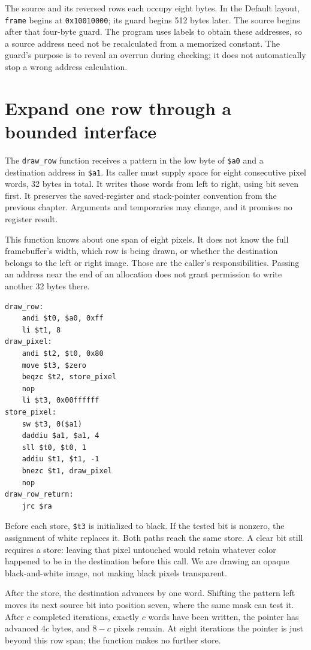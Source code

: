 The source and its reversed rows each occupy eight bytes. In the Default layout,
\texttt{frame} begins at \texttt{0x10010000}; its guard begins 512 bytes later.
The source begins after that four-byte guard. The program uses labels to obtain
these addresses, so a source address need not be recalculated from a memorized
constant. The guard's purpose is to reveal an overrun during checking; it does
not automatically stop a wrong address calculation.

\section{Expand one row through a bounded interface}

The \texttt{draw\_row} function receives a pattern in the low byte of
\texttt{\$a0} and a destination address in \texttt{\$a1}. Its caller must supply
space for eight consecutive pixel words, 32 bytes in total. It writes those words
from left to right, using bit seven first. It preserves the saved-register and
stack-pointer convention from the previous chapter. Arguments and temporaries
may change, and it promises no register result.

This function knows about one span of eight pixels. It does not know the full
framebuffer's width, which row is being drawn, or whether the destination belongs
to the left or right image. Those are the caller's responsibilities. Passing an
address near the end of an allocation does not grant permission to write another
32 bytes there.

\begin{verbatim}
draw_row:
    andi $t0, $a0, 0xff
    li $t1, 8
draw_pixel:
    andi $t2, $t0, 0x80
    move $t3, $zero
    beqzc $t2, store_pixel
    nop
    li $t3, 0x00ffffff
store_pixel:
    sw $t3, 0($a1)
    daddiu $a1, $a1, 4
    sll $t0, $t0, 1
    addiu $t1, $t1, -1
    bnezc $t1, draw_pixel
    nop
draw_row_return:
    jrc $ra
\end{verbatim}

Before each store, \texttt{\$t3} is initialized to black. If the tested bit is
nonzero, the assignment of white replaces it. Both paths reach the same store.
A clear bit still requires a store: leaving that pixel untouched would retain
whatever color happened to be in the destination before this call. We are drawing
an opaque black-and-white image, not making black pixels transparent.

After the store, the destination advances by one word. Shifting the pattern left
moves its next source bit into position seven, where the same mask can test it.
After $c$ completed iterations, exactly $c$ words have been written, the pointer
has advanced $4c$ bytes, and $8-c$ pixels remain. At eight iterations the pointer
is just beyond this row span; the function makes no further store.

